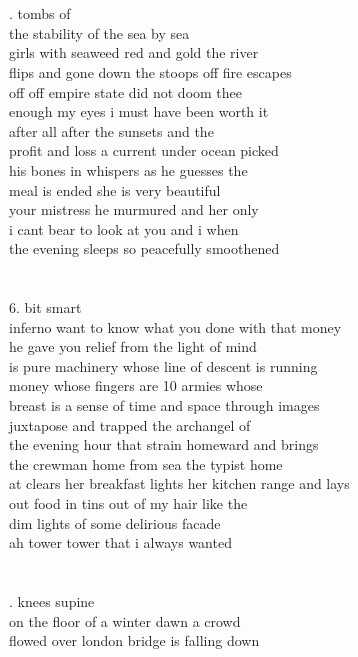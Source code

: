 \documentclass{article}
\begin{document}
\\
\\
\newpage
{}. tombs of\\
the stability of the sea by sea\\
girls with seaweed red and gold the river\\
flips and gone down the stoops off fire escapes\\
off off empire state did not doom thee\\
enough my eyes i must have been worth it\\
after all after the sunsets and the\\
profit and loss a current under ocean picked\\
his bones in whispers as he guesses the\\
meal is ended she is very beautiful\\
your mistress he murmured and her only\\
i cant bear to look at you and i when\\
the evening sleeps so peacefully smoothened\\
\\
\\
6. bit smart\\
inferno want to know what you done with that money\\
he gave you relief from the light of mind\\
is pure machinery whose line of descent is running\\
money whose fingers are 10 armies whose\\
breast is a sense of time and space through images\\
juxtapose and trapped the archangel of\\
the evening hour that strain homeward and brings\\
the crewman home from sea the typist home\\
at clears her breakfast lights her kitchen range and lays\\
out food in tins out of my hair like the\\
dim lights of some delirious facade\\
ah tower tower that i always wanted\\
\\
\\
\newpage
{}. knees supine\\
on the floor of a winter dawn a crowd\\
flowed over london bridge is falling down\\
\end{document}
